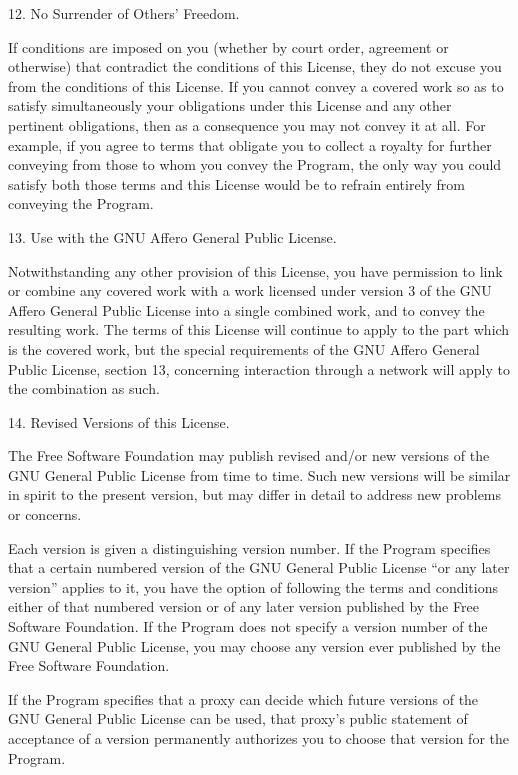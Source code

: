   12. No Surrender of Others' Freedom.

  If conditions are imposed on you (whether by court order, agreement or
otherwise) that contradict the conditions of this License, they do not
excuse you from the conditions of this License.  If you cannot convey a
covered work so as to satisfy simultaneously your obligations under this
License and any other pertinent obligations, then as a consequence you may
not convey it at all.  For example, if you agree to terms that obligate you
to collect a royalty for further conveying from those to whom you convey
the Program, the only way you could satisfy both those terms and this
License would be to refrain entirely from conveying the Program.

  13. Use with the GNU Affero General Public License.

  Notwithstanding any other provision of this License, you have
permission to link or combine any covered work with a work licensed
under version 3 of the GNU Affero General Public License into a single
combined work, and to convey the resulting work.  The terms of this
License will continue to apply to the part which is the covered work,
but the special requirements of the GNU Affero General Public License,
section 13, concerning interaction through a network will apply to the
combination as such.

  14. Revised Versions of this License.

  The Free Software Foundation may publish revised and/or new versions of
the GNU General Public License from time to time.  Such new versions will
be similar in spirit to the present version, but may differ in detail to
address new problems or concerns.

  Each version is given a distinguishing version number.  If the
Program specifies that a certain numbered version of the GNU General
Public License ``or any later version'' applies to it, you have the
option of following the terms and conditions either of that numbered
version or of any later version published by the Free Software
Foundation.  If the Program does not specify a version number of the
GNU General Public License, you may choose any version ever published
by the Free Software Foundation.

  If the Program specifies that a proxy can decide which future
versions of the GNU General Public License can be used, that proxy's
public statement of acceptance of a version permanently authorizes you
to choose that version for the Program.

